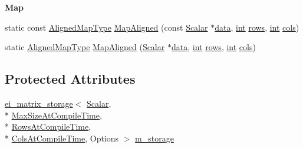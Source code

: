 \begin{Indent}{\bf Map}
\begin{DoxyCompactItemize}
\item 
static const \hyperlink{class_matrix_a8fbe7258317b503b5426051cc5602e5f}{Aligned\-Map\-Type} \hyperlink{class_matrix_ab5711308a9904f7059fc3a41d97c1d04}{Map\-Aligned} (const \hyperlink{class_matrix_base_a625df8339dc2d816cbc0fd66e7dadaf5}{Scalar} $\ast$\hyperlink{glext_8h_a8850df0785e6fbcc2351af3b686b8c7a}{data}, \hyperlink{ioapi_8h_a787fa3cf048117ba7123753c1e74fcd6}{int} \hyperlink{class_matrix_a5c0643ac5b12c576300a3c60899a61c9}{rows}, \hyperlink{ioapi_8h_a787fa3cf048117ba7123753c1e74fcd6}{int} \hyperlink{class_matrix_a6457e87782c95b003d23f8b8b90e6838}{cols})
\item 
static \hyperlink{class_matrix_a8fbe7258317b503b5426051cc5602e5f}{Aligned\-Map\-Type} \hyperlink{class_matrix_a876c6dfd566168154da3976e31f521f0}{Map\-Aligned} (\hyperlink{class_matrix_base_a625df8339dc2d816cbc0fd66e7dadaf5}{Scalar} $\ast$\hyperlink{glext_8h_a8850df0785e6fbcc2351af3b686b8c7a}{data}, \hyperlink{ioapi_8h_a787fa3cf048117ba7123753c1e74fcd6}{int} \hyperlink{class_matrix_a5c0643ac5b12c576300a3c60899a61c9}{rows}, \hyperlink{ioapi_8h_a787fa3cf048117ba7123753c1e74fcd6}{int} \hyperlink{class_matrix_a6457e87782c95b003d23f8b8b90e6838}{cols})
\end{DoxyCompactItemize}
\end{Indent}
\subsection*{Protected Attributes}
\begin{DoxyCompactItemize}
\item 
\hyperlink{classei__matrix__storage}{ei\-\_\-matrix\-\_\-storage}$<$ \hyperlink{class_matrix_base_a625df8339dc2d816cbc0fd66e7dadaf5}{Scalar}, \\*
\hyperlink{class_matrix_base_aaa53a8ec1bc1ba52b1e50631dac15d6da15fbad694bf6920ef57fabc0cb3e56ea}{Max\-Size\-At\-Compile\-Time}, \\*
\hyperlink{class_matrix_base_aaa53a8ec1bc1ba52b1e50631dac15d6da10c48c1361376cbd5ef62a18966f2691}{Rows\-At\-Compile\-Time}, \\*
\hyperlink{class_matrix_base_aaa53a8ec1bc1ba52b1e50631dac15d6da359babfd1277ae780433d99b383e00e8}{Cols\-At\-Compile\-Time}, Options $>$ \hyperlink{class_matrix_aeac955d8ec93c6f951886b51a8f85b77}{m\-\_\-storage}
\end{DoxyCompactItemize}
